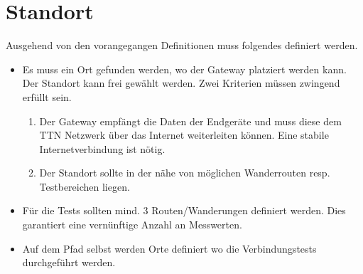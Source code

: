\documentclass[11pt,english,german]{report}
\theoremstyle{definition}
\begin{document}
\newpage
\section{Standort}
Ausgehend von den vorangegangen Definitionen muss folgendes definiert werden.
\begin{itemize}
	\item Es muss ein Ort gefunden werden, wo der Gateway platziert werden kann.\\[0.3cm]
	Der Standort kann frei gewählt werden. Zwei Kriterien müssen zwingend erfüllt sein. 
	\begin{enumerate}
		\item
		Der Gateway empfängt die Daten der Endgeräte und muss diese dem TTN Netzwerk über das Internet weiterleiten können. Eine stabile Internetverbindung ist nötig. 
		\item 
		Der Standort sollte in der nähe von möglichen Wanderrouten resp. Testbereichen liegen.
	\end{enumerate}
	\item Für die Tests sollten mind. 3 Routen/Wanderungen definiert werden. Dies garantiert eine vernünftige Anzahl an Messwerten.
	\item Auf dem Pfad selbst werden Orte definiert wo die Verbindungstests durchgeführt werden.
\end{itemize}

\newpage
\end{document}
